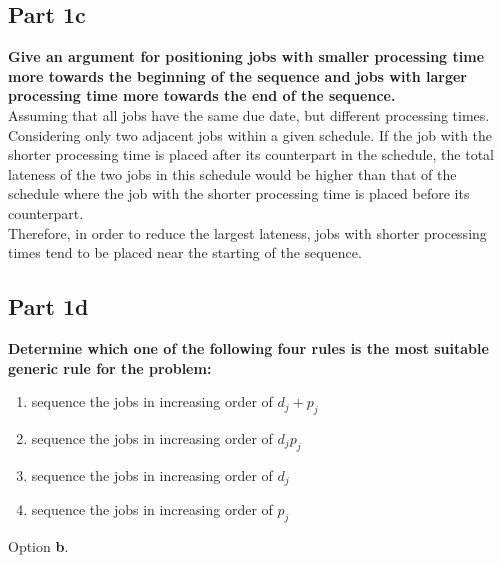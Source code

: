 \documentclass[a4paper, fleqn]{article}
\begin{document}
\pagebreak

\subsection{Part 1c}

\textbf{Give an argument for positioning jobs with smaller processing time more towards the beginning of the sequence and jobs with larger processing time more towards the end of the sequence.}\\
Assuming that all jobs have the same due date, but different processing times.\\ 
Considering only two adjacent jobs within a given schedule.
If the job with the shorter processing time is placed after its counterpart in the schedule, the total lateness of the two jobs in this schedule would be higher than that of the schedule where the job with the shorter processing time is placed before its counterpart.\\
Therefore, in order to reduce the largest lateness, jobs with shorter processing times tend to be placed near the starting of the sequence.  

\subsection{Part 1d}

\textbf{Determine which one of the following four rules is the most suitable generic rule for the problem:}
\begin{enumerate}[label=(\alph{*})]
\item sequence the jobs in increasing order of $d_j + p_j$
\item sequence the jobs in increasing order of $d_jp_j$
\item sequence the jobs in increasing order of $d_j$
\item sequence the jobs in increasing order of $p_j$
\end{enumerate}

Option \textbf{b}.
\end{document}

